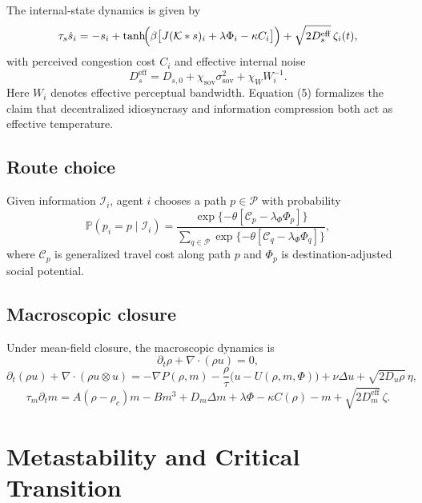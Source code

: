 \documentclass[11pt]{article}
\begin{document}
The internal-state dynamics is given by
\begin{equation}
\tau_s \dot s_i = -s_i + \tanh\!\Bigl(\beta\bigl[J(\mathcal K*s)_i + \lambda \Phi_i - \kappa C_i\bigr]\Bigr) + \sqrt{2D_s^{\mathrm{eff}}}\,\zeta_i(t),
\end{equation}
with perceived congestion cost $C_i$ and effective internal noise
\begin{equation}
D_s^{\mathrm{eff}} = D_{s,0} + \chi_{\mathrm{sov}}\sigma_{\mathrm{sov}}^2 + \chi_W W_i^{-1}.
\end{equation}
Here $W_i$ denotes effective perceptual bandwidth. Equation (5) formalizes the claim that decentralized idiosyncrasy and information compression both act as effective temperature.

\subsection{Route choice}
Given information $\mathcal I_i$, agent $i$ chooses a path $p\in\mathcal P$ with probability
\begin{equation}
\mathbb P(p_i=p\mid \mathcal I_i)=
\frac{\exp\{-\theta[\mathcal C_p-\lambda_\Phi \Phi_p]\}}
{\sum_{q\in\mathcal P}\exp\{-\theta[\mathcal C_q-\lambda_\Phi \Phi_q]\}},
\end{equation}
where $\mathcal C_p$ is generalized travel cost along path $p$ and $\Phi_p$ is destination-adjusted social potential.

\subsection{Macroscopic closure}
Under mean-field closure, the macroscopic dynamics is
\begin{equation}
\partial_t \rho + \nabla\!\cdot (\rho u)=0,
\end{equation}
\begin{equation}
\partial_t(\rho u)+\nabla\!\cdot(\rho u\otimes u)= -\nabla P(\rho,m)-\frac{\rho}{\tau}\bigl(u-U(\rho,m,\Phi)\bigr)+\nu\Delta u + \sqrt{2D_u\rho}\,\eta,
\end{equation}
\begin{equation}
\tau_m\partial_t m = A(\rho-\rho_c)m - Bm^3 + D_m\Delta m + \lambda\Phi - \kappa C(\rho) - m + \sqrt{2D_m^{\mathrm{eff}}}\,\zeta.
\end{equation}

\section{Metastability and Critical Transition}
\end{document}
